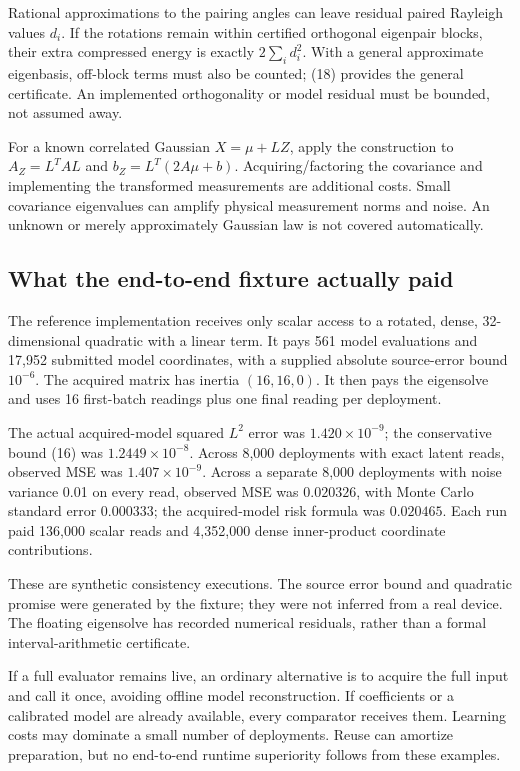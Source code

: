 \documentclass[11pt,a4paper]{article}
\begin{document}
Rational approximations to the pairing angles can leave residual paired Rayleigh values $d_i$. If the rotations remain within certified orthogonal eigenpair blocks, their extra compressed energy is exactly $2\sum_i d_i^2$. With a general approximate eigenbasis, off-block terms must also be counted; (18) provides the general certificate. An implemented orthogonality or model residual must be bounded, not assumed away.

For a known correlated Gaussian $X=\mu+LZ$, apply the construction to
$A_Z=L^TAL$ and $b_Z=L^T(2A\mu+b)$. Acquiring/factoring the covariance and implementing the transformed measurements are additional costs. Small covariance eigenvalues can amplify physical measurement norms and noise. An unknown or merely approximately Gaussian law is not covered automatically.

\subsection{What the end-to-end fixture actually paid}

The reference implementation receives only scalar access to a rotated, dense, 32-dimensional quadratic with a linear term. It pays 561 model evaluations and 17,952 submitted model coordinates, with a supplied absolute source-error bound $10^{-6}$. The acquired matrix has inertia $(16,16,0)$. It then pays the eigensolve and uses 16 first-batch readings plus one final reading per deployment.

The actual acquired-model squared $L^2$ error was $1.420\times10^{-9}$; the conservative bound (16) was $1.2449\times10^{-8}$. Across 8,000 deployments with exact latent reads, observed MSE was $1.407\times10^{-9}$. Across a separate 8,000 deployments with noise variance 0.01 on every read, observed MSE was $0.020326$, with Monte Carlo standard error $0.000333$; the acquired-model risk formula was $0.020465$. Each run paid 136,000 scalar reads and 4,352,000 dense inner-product coordinate contributions.

These are synthetic consistency executions. The source error bound and quadratic promise were generated by the fixture; they were not inferred from a real device. The floating eigensolve has recorded numerical residuals, rather than a formal interval-arithmetic certificate.

If a full evaluator remains live, an ordinary alternative is to acquire the full input and call it once, avoiding offline model reconstruction. If coefficients or a calibrated model are already available, every comparator receives them. Learning costs may dominate a small number of deployments. Reuse can amortize preparation, but no end-to-end runtime superiority follows from these examples.
\end{document}

